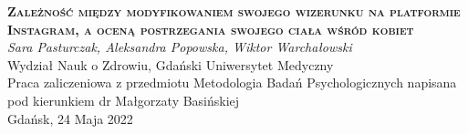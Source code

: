 \documentclass[12pt,a4paper,final,oneside,onecolumn,titlepage]{article}
\begin{document}

\begin{titlepage}
  \begin{center}
  \vspace*{1cm}
  \LARGE
  \textbf{\textsc{Zależność między modyfikowaniem swojego wizerunku na platformie Instagram, a oceną postrzegania swojego ciała wśród kobiet\\}}
  \vspace{1.5cm}
  \LARGE
  \textit{Sara Pasturczak, Aleksandra Popowska, Wiktor Warchałowski\\}
  \Large
  Wydział Nauk o Zdrowiu, Gdański Uniwersytet Medyczny\\
  \vspace{3cm}
  Praca zaliczeniowa z przedmiotu Metodologia Badań Psychologicznych napisana pod kierunkiem dr Małgorzaty Basińskiej\\
  \vspace{3cm}
  Gdańsk, 24 Maja 2022
  \end{center}
\end{titlepage}
\end{document}
